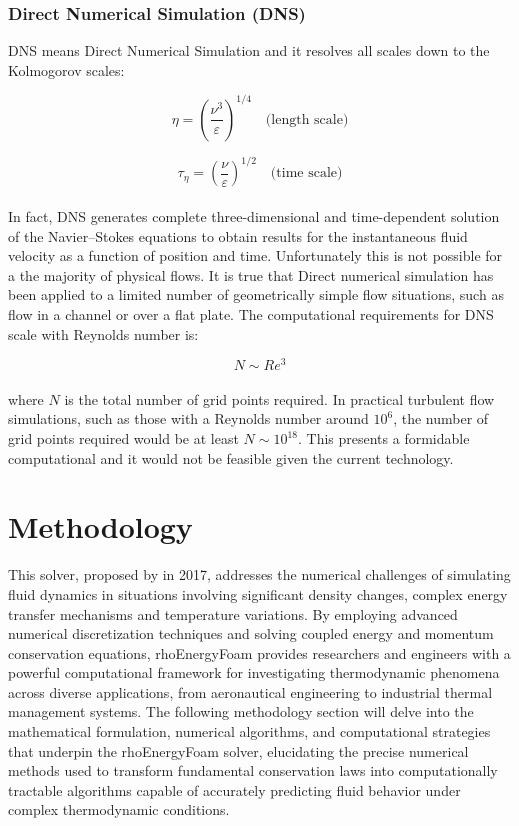 \documentclass[a5paper]{sapthesis}
\begin{document}
	\subsection{Direct Numerical Simulation (DNS)}
	DNS means Direct Numerical Simulation and it resolves all scales down to the Kolmogorov scales:
	
	\begin{equation}
		\eta = \left(\frac{\nu^3}{\varepsilon}\right)^{1/4} \quad \text{(length scale)}
	\end{equation}
	
	\begin{equation}
		\tau_\eta = \left(\frac{\nu}{\varepsilon}\right)^{1/2} \quad \text{(time scale)}
	\end{equation}
	\\
	In fact, DNS generates complete three-dimensional and time-dependent solution of the Navier–Stokes equations to obtain results for the instantaneous fluid velocity as a function of position and time. Unfortunately this is not possible for a the majority of physical flows. It is true that Direct numerical simulation has been applied to a limited number of geometrically simple flow situations, such as flow in a channel or over a flat plate. 
	The computational requirements for DNS scale with Reynolds number is:
	
	\begin{equation}
		N \sim Re^3
	\end{equation}
	\\
	where $N$ is the total number of grid points required. In practical turbulent flow simulations, such as those with a Reynolds number around $10^6$, the number of grid points required would be at least $N\sim 10^{18}$. This presents a formidable computational and it would not be feasible given the current technology.
		
	\chapter{Methodology}
	\label{chap:methodology}
    This solver, proposed by \citet{rhoEnergyFOAM} in 2017, addresses the numerical challenges of simulating fluid dynamics in situations involving significant density changes, complex energy transfer mechanisms and temperature variations. By employing advanced numerical discretization techniques and solving coupled energy and momentum conservation equations, rhoEnergyFoam provides researchers and engineers with a powerful computational framework for investigating thermodynamic phenomena across diverse applications, from aeronautical engineering to industrial thermal management systems. The following methodology section will delve into the mathematical formulation, numerical algorithms, and computational strategies that underpin the rhoEnergyFoam solver, elucidating the precise numerical methods used to transform fundamental conservation laws into computationally tractable algorithms capable of accurately predicting fluid behavior under complex thermodynamic conditions.
	
\end{document}
